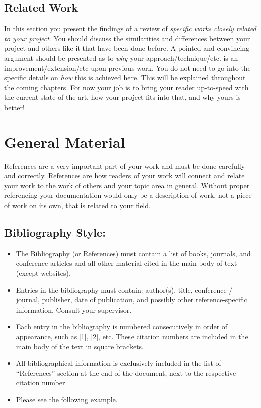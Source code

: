 \documentclass{report}[a4paper,12pt,onecolumn]
\begin{document}
\subsection{Related Work}

In this section you present the findings of a review of \textit{specific works closely related to your project}. You should discuss the similarities and differences between your project and others like it that have been done before. A pointed and convincing argument should be presented as to \textit{why} your approach/technique/etc. is an improvement/extension/etc upon previous work. You do not need to go into the specific details on \textit{how} this is achieved here. This will be explained throughout the coming chapters. For now your job is to bring your reader up-to-speed with the current state-of-the-art, how your project fits into that, and why yours is better!

\section{General Material}

References are a very important part of your work and must be done carefully and correctly. References are how readers of your work will connect and relate your work to the work of others and your topic area in general. Without proper referencing your documentation would only be a description of work, not a piece of work on its own, that is related to your field.

\subsection{Bibliography Style:}

\begin{itemize}
    \item The Bibliography (or References) must contain a list of books, journals, and conference articles and all other material cited in the main body of text (except websites).
    \item Entries in the bibliography must contain: author(s), title, 
conference / journal, publisher, date of publication, and possibly other 
reference-specific information. Consult your supervisor.
    \item Each entry in the bibliography is numbered consecutively in order of appearance, such as [1], [2], etc. These citation numbers are included in the main body of the text in square brackets.
    \item All bibliographical information is exclusively included in the list of ``References'' section at the end of the document, next to the respective citation number.
    \item Please see the following example.
\end{itemize}
\end{document}
